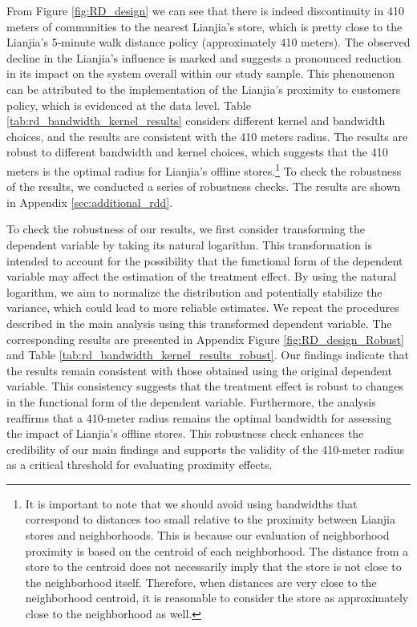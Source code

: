 \documentclass[11pt]{article}
\begin{document}
From Figure \ref{fig:RD_design} we can see that there is indeed discontinuity in 410 meters of communities to the nearest Lianjia's store, which is pretty close to the Lianjia's 5-minute walk distance policy (approximately 410 meters). The observed decline in the Lianjia's influence is marked and suggests a pronounced reduction in its impact on the system overall within our study sample. This phenomenon can be attributed to the implementation of the Lianjia's proximity to customers policy, which is evidenced at the data level. Table \ref{tab:rd_bandwidth_kernel_results} considers different kernel and bandwidth choices, and the results are consistent with the 410 meters radius. The results are robust to different bandwidth and kernel choices, which suggests that the 410 meters is the optimal radius for Lianjia's offline stores.\footnote{It is important to note that we should avoid using bandwidths that correspond to distances too small relative to the proximity between Lianjia stores and neighborhoods. This is because our evaluation of neighborhood proximity is based on the centroid of each neighborhood. The distance from a store to the centroid does not necessarily imply that the store is not close to the neighborhood itself. Therefore, when distances are very close to the neighborhood centroid, it is reasonable to consider the store as approximately close to the neighborhood as well.} To check the robustness of the results, we conducted a series of robustness checks. The results are shown in Appendix \ref{sec:additional_rdd}.

To check the robustness of our results, we first consider transforming the dependent variable by taking its natural logarithm. This transformation is intended to account for the possibility that the functional form of the dependent variable may affect the estimation of the treatment effect. By using the natural logarithm, we aim to normalize the distribution and potentially stabilize the variance, which could lead to more reliable estimates. We repeat the procedures described in the main analysis using this transformed dependent variable. The corresponding results are presented in Appendix Figure \ref{fig:RD_design_Robust} and Table \ref{tab:rd_bandwidth_kernel_results_robust}. Our findings indicate that the results remain consistent with those obtained using the original dependent variable. This consistency suggests that the treatment effect is robust to changes in the functional form of the dependent variable. Furthermore, the analysis reaffirms that a 410-meter radius remains the optimal bandwidth for assessing the impact of Lianjia's offline stores. This robustness check enhances the credibility of our main findings and supports the validity of the 410-meter radius as a critical threshold for evaluating proximity effects.
\end{document}
